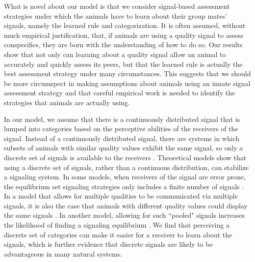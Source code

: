 What is novel about our model is that we consider signal-based assessment strategies under which the animals have to learn about their group mates' signals, namely the learned rule and categorization. It is often assumed, without much empirical justification, that, if animals are using a quality signal to assess conspecifics, they are born with the understanding of how to do so. Our results show that not only can learning about a quality signal allow an animal to accurately and quickly assess its peers, but that the learned rule is actually the best assessment strategy under many circumstances. This suggests that we should be more circumspect in making assumptions about animals using an innate signal assessment strategy and that careful empirical work is needed to identify the strategies that animals are actually using.

In our model, we assume that there is a continuously distributed signal that is lumped into categories based on the perceptive abilities of the receivers of the signal. Instead of a continuously distributed signal, there are systems in which subsets of animals with similar quality values exhibit the same signal, so only a discrete set of signals is available to the receivers \citep{Johnstone:1994uq}. Theoretical models show that using a discrete set of signals, rather than a continuous distribution, can stabilize a signaling system. In some models, when receivers of the signal are error prone, the equilibrium set  signaling strategies only includes a finite number of signals \citep{Grafen:1993kx,Johnstone:1994uq}. In a model that allows for multiple qualities to be communicated via multiple signals, it is also the case that animals with different quality values could display the same signals \citep{Johnstone:1995vn}. In another model, allowing for such ``pooled" signals increases the likelihood of finding a signaling equilibrium \citep{Lachmann:1998fk}. We find that perceiving a discrete set of categories can make it easier for a receiver to learn about the signals, which is further evidence that discrete signals are likely to be advantageous in many natural systems.

